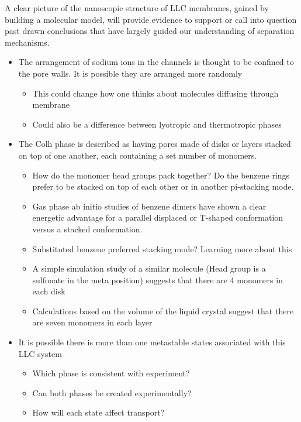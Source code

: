 \documentclass{article}
\begin{document}
	A clear picture of the nanoscopic structure of LLC membranes, gained by building a molecular model, 
will provide evidence to support or call into question past drawn conclusions that have largely guided our understanding of separation mechanisms. 
	\begin{itemize}
		\item The arrangement of sodium ions in the channels is thought to be confined to the pore walls. It is possible they are arranged more randomly
		\begin{itemize}
			\item This could change how one thinks about molecules diffusing through membrane
			\item Could also be a difference between lyotropic and thermotropic phases
		\end{itemize}
		\item The Colh phase is described as having pores made of disks or layers stacked on top of one another, each containing a set number of monomers. 
		\begin{itemize}
			\item How do the monomer head groups pack together? Do the benzene rings prefer to be stacked on top of each other or in another pi-stacking mode.
			\item Gas phase ab initio studies of benzene dimers have shown a clear energetic advantage for a parallel displaced or T-shaped conformation versus a stacked conformation. 
			\item Substituted benzene preferred stacking mode? Learning more about this   	
			\item A simple simulation study of a similar molecule (Head group is a sulfonate in the meta position) suggests that there are 4 monomers in each disk
			\item Calculations based on the volume of the liquid crystal suggest that there are seven monomers in each layer 
		\end{itemize}
		\item It is possible there is more than one metastable states associated with this LLC system
		\begin{itemize}
			\item Which phase is consistent with experiment?
			\item Can both phases be created experimentally?
			\item How will each state affect transport?
		\end{itemize}
	\end{itemize}
	
\end{document}
